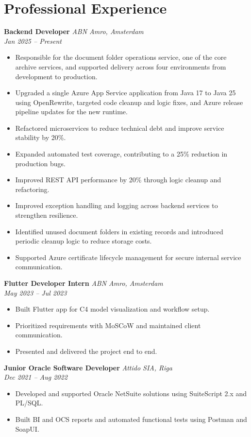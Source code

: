 \section*{Professional Experience}


\textbf{Backend Developer} \hfill \textit{ABN Amro, Amsterdam}\\
\textit{Jan 2025 – Present}
\begin{itemize}[leftmargin=*]
  \item Responsible for the document folder operations service, one of the core archive services, and supported delivery across four environments from development to production.
  \item Upgraded a single Azure App Service application from Java 17 to Java 25 using OpenRewrite, targeted code cleanup and logic fixes, and Azure release pipeline updates for the new runtime.
  \item Refactored microservices to reduce technical debt and improve service stability by 20\%.
  \item Expanded automated test coverage, contributing to a 25\% reduction in production bugs.
  \item Improved REST API performance by 20\% through logic cleanup and refactoring.
  \item Improved exception handling and logging across backend services to strengthen resilience.
  \item Identified unused document folders in existing records and introduced periodic cleanup logic to reduce storage costs.
  \item Supported Azure certificate lifecycle management for secure internal service communication.
\end{itemize}

\vspace{2pt}
\textbf{Flutter Developer Intern} \hfill \textit{ABN Amro, Amsterdam}\\
\textit{May 2023 – Jul 2023}
\begin{itemize}[leftmargin=*]
  \item Built Flutter app for C4 model visualization and workflow setup.
  \item Prioritized requirements with MoSCoW and maintained client communication.
  \item Presented and delivered the project end to end.
\end{itemize}

\vspace{2pt}
\textbf{Junior Oracle Software Developer} \hfill \textit{Attido SIA, Riga}\\
\textit{Dec 2021 – Aug 2022}
\begin{itemize}[leftmargin=*]
  \item Developed and supported Oracle NetSuite solutions using SuiteScript 2.x and PL/SQL.
  \item Built BI and OCS reports and automated functional tests using Postman and SoapUI.
\end{itemize}